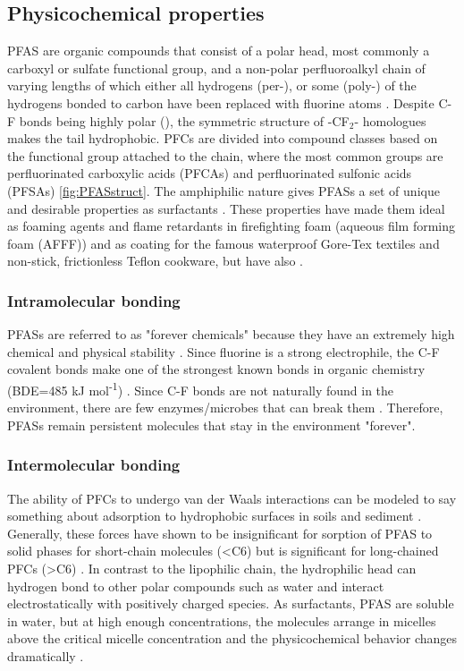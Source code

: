 \subsection{Physicochemical properties}
PFAS are organic compounds that consist of a polar head, most commonly a carboxyl or sulfate
functional group, and a non-polar perfluoroalkyl chain of varying lengths of which either all
hydrogens (per-), or some (poly-) of the hydrogens bonded to carbon have been replaced with
fluorine atoms \citep{wang2011physchem}. Despite C-F bonds being highly polar (\textDelta {}), the symmetric structure of -CF$_2$- homologues makes the tail hydrophobic. PFCs are divided into compound classes based on the functional group attached to the chain, where the most common groups are perfluorinated carboxylic acids (PFCAs) and perfluorinated sulfonic acids (PFSAs) \cref{fig:PFASstruct}. The amphiphilic nature gives PFASs a set of unique and desirable properties as surfactants \citep{du2014adsorption}. These properties have made them ideal as foaming agents and flame retardants in firefighting foam (aqueous film forming foam (AFFF)) and as coating for the famous waterproof Gore-Tex\textsuperscript{\textregistered} textiles and non-stick, frictionless Teflon\textsuperscript{\texttrademark} cookware, but have also . 

\subsubsection{Intramolecular bonding}
PFASs are referred to as "forever chemicals" because they have an extremely high chemical and physical stability \citep{beans2021}. Since fluorine is a strong electrophile, the C-F covalent bonds make one of the strongest known bonds in organic chemistry (BDE=485 kJ mol\textsuperscript{-1}) \citep{Lau2007}. Since C-F bonds are not naturally found in the environment, there are few enzymes/microbes that can break them \citep{shahsavari2021}. Therefore, PFASs remain persistent molecules that stay in the environment "forever". 

\subsubsection{Intermolecular bonding}
The ability of PFCs to undergo van der Waals interactions can be modeled to say something about adsorption to hydrophobic surfaces in soils and sediment \citep{Arp2006}. Generally, these forces have shown to be insignificant for sorption of PFAS to solid phases for short-chain molecules (\textless C6) but is significant for long-chained PFCs (\textgreater C6) \citep{du2014adsorption}. In contrast to the lipophilic chain, the hydrophilic head can hydrogen bond to other polar compounds such as water and interact electrostatically with positively charged species. As surfactants, PFAS are soluble in water, but at high enough concentrations, the molecules arrange in micelles above the critical micelle concentration and the physicochemical behavior changes dramatically \citep{bhhatarai2011,Goss2009comment}.  

